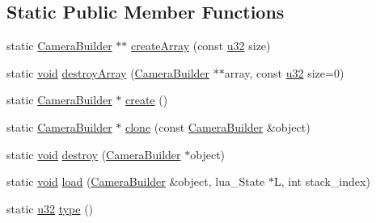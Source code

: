 \subsection*{Static Public Member Functions}
\begin{DoxyCompactItemize}
\item 
static \mbox{\hyperlink{classnjli_1_1_camera_builder}{Camera\+Builder}} $\ast$$\ast$ \mbox{\hyperlink{classnjli_1_1_camera_builder_aedcc9f2ff4a35d86c562ec08fe2d08d0}{create\+Array}} (const \mbox{\hyperlink{_util_8h_a10e94b422ef0c20dcdec20d31a1f5049}{u32}} size)
\item 
static \mbox{\hyperlink{_thread_8h_af1e856da2e658414cb2456cb6f7ebc66}{void}} \mbox{\hyperlink{classnjli_1_1_camera_builder_a026f6adbd0bdf70484ca92dbe37b8d16}{destroy\+Array}} (\mbox{\hyperlink{classnjli_1_1_camera_builder}{Camera\+Builder}} $\ast$$\ast$array, const \mbox{\hyperlink{_util_8h_a10e94b422ef0c20dcdec20d31a1f5049}{u32}} size=0)
\item 
static \mbox{\hyperlink{classnjli_1_1_camera_builder}{Camera\+Builder}} $\ast$ \mbox{\hyperlink{classnjli_1_1_camera_builder_abdd01724b7aa8ecf4013d9ec6ee8f30d}{create}} ()
\item 
static \mbox{\hyperlink{classnjli_1_1_camera_builder}{Camera\+Builder}} $\ast$ \mbox{\hyperlink{classnjli_1_1_camera_builder_a54a9769ec9ff8dff4b69b4f32c9f22f8}{clone}} (const \mbox{\hyperlink{classnjli_1_1_camera_builder}{Camera\+Builder}} \&object)
\item 
static \mbox{\hyperlink{_thread_8h_af1e856da2e658414cb2456cb6f7ebc66}{void}} \mbox{\hyperlink{classnjli_1_1_camera_builder_a787c5a9f6c3b698c9d099af8b6d41d7c}{destroy}} (\mbox{\hyperlink{classnjli_1_1_camera_builder}{Camera\+Builder}} $\ast$object)
\item 
static \mbox{\hyperlink{_thread_8h_af1e856da2e658414cb2456cb6f7ebc66}{void}} \mbox{\hyperlink{classnjli_1_1_camera_builder_aaf7da6a4e59e7d986cd04158472552b2}{load}} (\mbox{\hyperlink{classnjli_1_1_camera_builder}{Camera\+Builder}} \&object, lua\+\_\+\+State $\ast$L, int stack\+\_\+index)
\item 
static \mbox{\hyperlink{_util_8h_a10e94b422ef0c20dcdec20d31a1f5049}{u32}} \mbox{\hyperlink{classnjli_1_1_camera_builder_a3745618af153d80fd6b291de25629888}{type}} ()
\end{DoxyCompactItemize}
